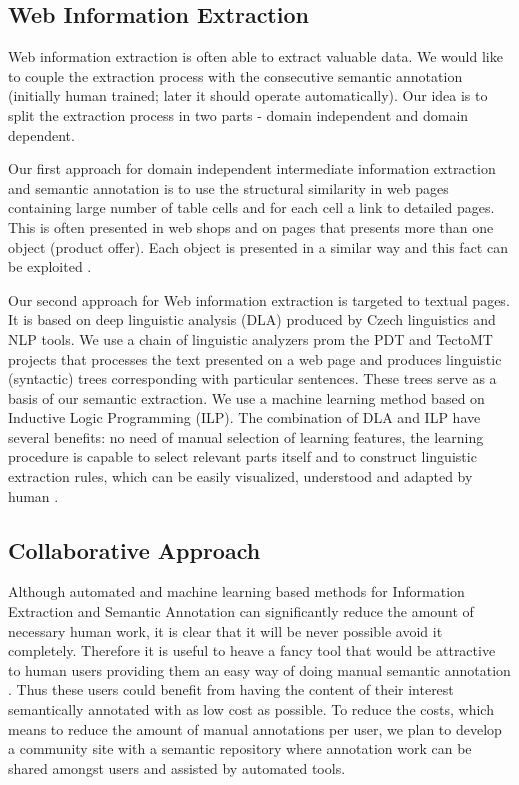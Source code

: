\documentclass[runningheads,a4paper]{llncs}
\begin{document}
\subsection{Web Information Extraction}
Web information extraction \cite{biblio:WebDataMining} is often able to extract valuable data. We would like to couple the extraction process with the consecutive semantic annotation (initially human trained; later it should operate automatically). Our idea is to split the extraction process in two parts - domain independent and domain dependent. 


Our first approach for domain independent intermediate information extraction and semantic annotation is to use the structural similarity in web pages containing large number of table cells and for each cell a link to detailed pages. This is often presented in web shops and on pages that presents more than one object (product offer). Each object is presented in a similar way and this fact can be exploited \cite{biblio:EcHoUncertaintyIssues2008}.


Our second approach for Web information extraction is targeted to textual pages. It is based on deep linguistic analysis (DLA) produced by Czech linguistics and NLP tools. We use a chain of linguistic analyzers prom the PDT and TectoMT projects that processes the text presented on a web page and produces linguistic (syntactic) trees corresponding with particular sentences. These trees serve as a basis of our semantic extraction. We use a machine learning method based on Inductive Logic Programming (ILP). The combination of DLA and ILP have several benefits: no need of manual selection of learning features, the learning procedure is capable to select relevant parts itself and to construct linguistic extraction rules, which can be easily visualized, understood and adapted by human \cite{biblio:DedekISWC2010}. 

\subsection{Collaborative Approach}
Although automated and machine learning based methods for Information Extraction and Semantic Annotation can significantly reduce the amount of necessary human work, it is clear that it will be never possible avoid it completely. Therefore it is useful to heave a fancy tool that would be attractive to human users providing them an easy way of doing manual semantic annotation \cite{biblio:FiserMaster}. Thus these users could benefit from having the content of their interest semantically annotated with as low cost as possible. To reduce the costs, which means to reduce the amount of manual annotations per user, we plan to develop a community site with a semantic repository \cite{biblio:LasekWWW} where annotation work can be shared amongst users and assisted by automated tools.
\end{document}
